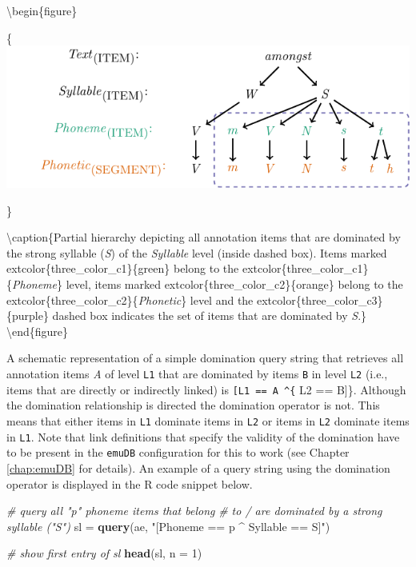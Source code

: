 \documentclass[]{book}
\newenvironment{Shaded}{\begin{snugshade}}{\end{snugshade}}
\newcommand{\CommentTok}[1]{\textcolor[rgb]{0.56,0.35,0.01}{\textit{#1}}}
\newcommand{\DataTypeTok}[1]{\textcolor[rgb]{0.13,0.29,0.53}{#1}}
\newcommand{\DecValTok}[1]{\textcolor[rgb]{0.00,0.00,0.81}{#1}}
\newcommand{\KeywordTok}[1]{\textcolor[rgb]{0.13,0.29,0.53}{\textbf{#1}}}
\newcommand{\NormalTok}[1]{#1}
\newcommand{\StringTok}[1]{\textcolor[rgb]{0.31,0.60,0.02}{#1}}
\theoremstyle{definition}
\theoremstyle{definition}
\theoremstyle{definition}
\theoremstyle{remark}
\begin{document}
\textbackslash{}begin\{figure\}

\{\centering \includegraphics[width=0.75\linewidth]{pics/amongstHierDomination}

\}

\textbackslash{}caption\{Partial hierarchy depicting all annotation
items that are dominated by the strong syllable (\emph{S}) of the
\emph{Syllable} level (inside dashed box). Items marked
extcolor\{three\_color\_c1\}\{green\} belong to the
extcolor\{three\_color\_c1\}\{\emph{Phoneme}\} level, items marked
extcolor\{three\_color\_c2\}\{orange\} belong to the
extcolor\{three\_color\_c2\}\{\emph{Phonetic}\} level and the
extcolor\{three\_color\_c3\}\{purple\} dashed box indicates the set of
items that are dominated by \emph{S}.\}\label{fig:amongstHierDomintation}
\textbackslash{}end\{figure\}

A schematic representation of a simple domination query string that
retrieves all annotation items \emph{A} of level \texttt{L1} that are
dominated by items \texttt{B} in level \texttt{L2} (i.e., items that are
directly or indirectly linked) is \texttt{{[}L1\ ==\ A\ \^{}\{} L2 ==
B{]}\}. Although the domination relationship is directed the domination
operator is not. This means that either items in \texttt{L1} dominate
items in \texttt{L2} or items in \texttt{L2} dominate items in
\texttt{L1}. Note that link definitions that specify the validity of the
domination have to be present in the \texttt{emuDB} configuration for
this to work (see Chapter \ref{chap:emuDB} for details). An example of a
query string using the domination operator is displayed in the R code
snippet below.

\begin{Shaded}
\begin{Highlighting}[]
\CommentTok{# query all "p" phoneme items that belong}
\CommentTok{# to / are dominated by a strong syllable ("S")}
\NormalTok{sl =}\StringTok{ }\KeywordTok{query}\NormalTok{(ae, }\StringTok{"[Phoneme == p ^ Syllable == S]"}\NormalTok{)}

\CommentTok{# show first entry of sl}
\KeywordTok{head}\NormalTok{(sl, }\DataTypeTok{n =} \DecValTok{1}\NormalTok{)}
\end{Highlighting}
\end{Shaded}
\end{document}
